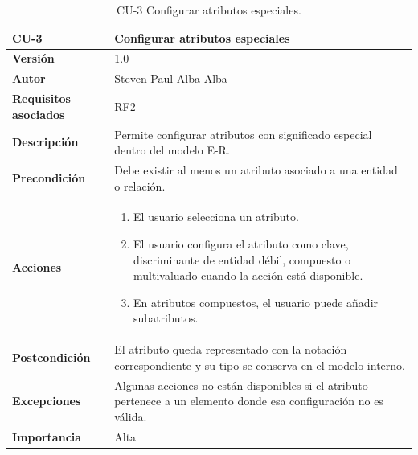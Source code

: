 \begin{table}[p]
\centering
\begin{tabularx}{\linewidth}{ p{} p{} }
\toprule
\textbf{CU-3} & \textbf{Configurar atributos especiales}\\
\toprule
\textbf{Versión} & 1.0 \\
\textbf{Autor} & Steven Paul Alba Alba \\
\textbf{Requisitos asociados} & RF2 \\
\textbf{Descripción} & Permite configurar atributos con significado especial dentro del modelo E-R. \\
\textbf{Precondición} & Debe existir al menos un atributo asociado a una entidad o relación. \\
\textbf{Acciones} &
\begin{enumerate}
\def\labelenumi{\arabic{enumi}.}
\tightlist
\item El usuario selecciona un atributo.
\item El usuario configura el atributo como clave, discriminante de entidad débil, compuesto o multivaluado cuando la acción está disponible.
\item En atributos compuestos, el usuario puede añadir subatributos.
\end{enumerate}\\
\textbf{Postcondición} & El atributo queda representado con la notación correspondiente y su tipo se conserva en el modelo interno. \\
\textbf{Excepciones} & Algunas acciones no están disponibles si el atributo pertenece a un elemento donde esa configuración no es válida. \\
\textbf{Importancia} & Alta \\
\bottomrule
\end{tabularx}
\caption{CU-3 Configurar atributos especiales.}
\end{table}

